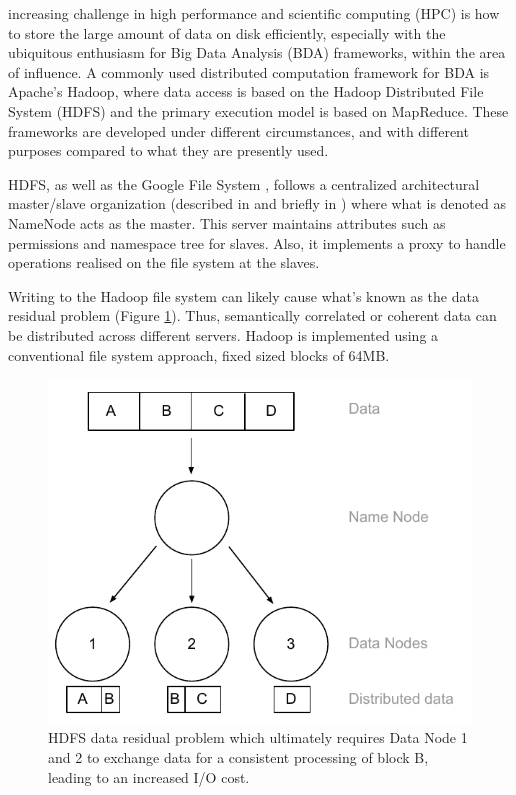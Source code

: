  increasing challenge in high performance and scientific computing (HPC) is how to store the large amount of data on disk efficiently, especially with the ubiquitous enthusiasm for Big Data Analysis (BDA) frameworks, within the area of influence. A commonly used distributed computation framework for BDA is Apache's Hadoop\cite{PageHadoop}, where data access is based on the Hadoop Distributed File System (HDFS) \cite{Shvachko:2010:HDF:1913798.1914427} and the primary execution model is based on MapReduce\cite{Dean:2008:MSD:1327452.1327492}. These frameworks are developed under different circumstances, and with different purposes compared to what they are presently used.
\newline

HDFS, as well as the Google File System \cite{Ghemawat:2003:GFS:945445.945450}, follows a centralized architectural master/slave organization (described in \cite{Tanenbaum:2006:DSP:1202502} and briefly in \cite{Wilkinson:1998:PPT:289352}) where what is denoted as NameNode acts as the master. This server maintains attributes such as permissions and namespace tree for slaves. Also, it implements a proxy to handle operations realised on the file system at the slaves. 
\newline

Writing to the Hadoop file system can likely cause what's known as the data residual problem (Figure \ref{fig:data-residual}). Thus, semantically correlated or coherent data can be distributed across different servers. Hadoop is implemented using a conventional file system approach, \ie fixed sized blocks of 64MB. 
\newpage

\begin{figure}
	\centering
	\hspace*{15mm}
	\includegraphics[scale=0.8]{pdf/data-residual.pdf}
	\caption[HDFS data residual problem]{HDFS data residual problem which ultimately requires Data Node 1 and 2 to exchange data for a consistent processing of block B, leading to an increased I/O cost. \label{fig:data-residual}}
\end{figure}

